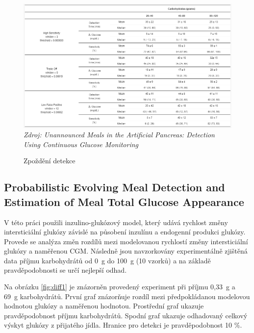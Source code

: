 \begin{figure}[H]
\caption{Zpoždění detekce}
\label{fig:crosscovariance3}
\includegraphics[width=1\textwidth]{img/analyza/crosscovariance3.png}\\
\textit{Zdroj: Unannounced Meals in the Artificial Pancreas: Detection Using Continuous Glucose Monitoring \citep{Analyza.CrossCovariance}}
\end{figure}


\subsection{Probabilistic Evolving Meal Detection and Estimation of Meal Total Glucose Appearance}
\label{ch:diff}

V této práci \citet{Analyza.Diff} použili inzulino-glukózový model, který udává rychlost změny intersticiální glukózy závislé na působení inzulínu a endogenní produkci glukózy. Provede se analýza změn rozdílů mezi modelovanou rychlostí změny intersticiální glukózy a naměřenou CGM. Následně jsou navzorkovány experimentálně zjištěná data příjmu karbohydrátů od 0~g do 100~g (10 vzorků) a na základě pravděpodobnosti se určí nejlepší odhad.

Na obrázku \ref{fig:diff1} je znázorněn provedený experiment při příjmu 0,33~g a 69~g karbohydrátů. První graf znázorňuje rozdíl mezi předpokládanou modelovou hodnotou glukózy a naměřenou hodnotou. Prostřední graf ukazuje pravděpodobnost příjmu karbohydrátů. Spodní graf ukazuje odhadovaný celkový výskyt glukózy z přijatého jídla. Hranice pro detekci je pravděpodobnost 10 \%.

